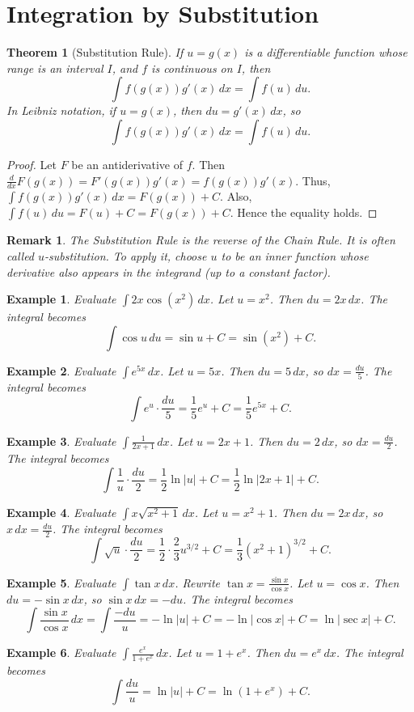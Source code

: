 \documentclass[11pt,a4paper]{article}
\newtheorem{example}{Example}
\newtheorem{theorem}{Theorem}
\newtheorem{remark}{Remark}
\begin{document}
\section{Integration by Substitution}
\begin{theorem}[Substitution Rule]
If $u = g(x)$ is a differentiable function whose range is an interval $I$, and $f$ is continuous on $I$, then
\[
\int f(g(x)) g'(x) \, dx = \int f(u) \, du.
\]
In Leibniz notation, if $u = g(x)$, then $du = g'(x) \, dx$, so
\[
\int f(g(x)) g'(x) \, dx = \int f(u) \, du.
\]
\end{theorem}
\begin{proof}
Let $F$ be an antiderivative of $f$. Then $\frac{d}{dx} F(g(x)) = F'(g(x)) g'(x) = f(g(x)) g'(x)$. Thus, $\int f(g(x)) g'(x) \, dx = F(g(x)) + C$. Also, $\int f(u) \, du = F(u) + C = F(g(x)) + C$. Hence the equality holds.
\end{proof}
\begin{remark}
The Substitution Rule is the reverse of the Chain Rule. It is often called $u$-substitution. To apply it, choose $u$ to be an inner function whose derivative also appears in the integrand (up to a constant factor).
\end{remark}
\begin{example}
Evaluate $\displaystyle \int 2x \cos(x^2) \, dx$.
Let $u = x^2$. Then $du = 2x \, dx$. The integral becomes
\[
\int \cos u \, du = \sin u + C = \sin(x^2) + C.
\]
\end{example}
\begin{example}
Evaluate $\displaystyle \int e^{5x} \, dx$.
Let $u = 5x$. Then $du = 5 \, dx$, so $dx = \frac{du}{5}$. The integral becomes
\[
\int e^u \cdot \frac{du}{5} = \frac{1}{5} e^u + C = \frac{1}{5} e^{5x} + C.
\]
\end{example}
\begin{example}
Evaluate $\displaystyle \int \frac{1}{2x+1} \, dx$.
Let $u = 2x+1$. Then $du = 2 \, dx$, so $dx = \frac{du}{2}$. The integral becomes
\[
\int \frac{1}{u} \cdot \frac{du}{2} = \frac{1}{2} \ln|u| + C = \frac{1}{2} \ln|2x+1| + C.
\]
\end{example}
\begin{example}
Evaluate $\displaystyle \int x \sqrt{x^2 + 1} \, dx$.
Let $u = x^2 + 1$. Then $du = 2x \, dx$, so $x \, dx = \frac{du}{2}$. The integral becomes
\[
\int \sqrt{u} \cdot \frac{du}{2} = \frac{1}{2} \cdot \frac{2}{3} u^{3/2} + C = \frac{1}{3} (x^2 + 1)^{3/2} + C.
\]
\end{example}
\begin{example}
Evaluate $\displaystyle \int \tan x \, dx$.
Rewrite $\tan x = \frac{\sin x}{\cos x}$. Let $u = \cos x$. Then $du = -\sin x \, dx$, so $\sin x \, dx = -du$. The integral becomes
\[
\int \frac{\sin x}{\cos x} \, dx = \int \frac{-du}{u} = -\ln|u| + C = -\ln|\cos x| + C = \ln|\sec x| + C.
\]
\end{example}
\begin{example}
Evaluate $\displaystyle \int \frac{e^x}{1 + e^x} \, dx$.
Let $u = 1 + e^x$. Then $du = e^x \, dx$. The integral becomes
\[
\int \frac{du}{u} = \ln|u| + C = \ln(1 + e^x) + C.
\]
\end{example}
\end{document}
